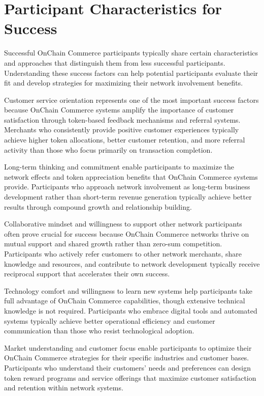 \documentclass[
  Letterpaper,
]{scrbook}
\begin{document}
\section{Participant Characteristics for
Success}\label{participant-characteristics-for-success}

Successful OnChain Commerce participants typically share certain
characteristics and approaches that distinguish them from less
successful participants. Understanding these success factors can help
potential participants evaluate their fit and develop strategies for
maximizing their network involvement benefits.

Customer service orientation represents one of the most important
success factors because OnChain Commerce systems amplify the importance
of customer satisfaction through token-based feedback mechanisms and
referral systems. Merchants who consistently provide positive customer
experiences typically achieve higher token allocations, better customer
retention, and more referral activity than those who focus primarily on
transaction completion.

Long-term thinking and commitment enable participants to maximize the
network effects and token appreciation benefits that OnChain Commerce
systems provide. Participants who approach network involvement as
long-term business development rather than short-term revenue generation
typically achieve better results through compound growth and
relationship building.

Collaborative mindset and willingness to support other network
participants often prove crucial for success because OnChain Commerce
networks thrive on mutual support and shared growth rather than zero-sum
competition. Participants who actively refer customers to other network
merchants, share knowledge and resources, and contribute to network
development typically receive reciprocal support that accelerates their
own success.

Technology comfort and willingness to learn new systems help
participants take full advantage of OnChain Commerce capabilities,
though extensive technical knowledge is not required. Participants who
embrace digital tools and automated systems typically achieve better
operational efficiency and customer communication than those who resist
technological adoption.

Market understanding and customer focus enable participants to optimize
their OnChain Commerce strategies for their specific industries and
customer bases. Participants who understand their customers' needs and
preferences can design token reward programs and service offerings that
maximize customer satisfaction and retention within network systems.
\end{document}
